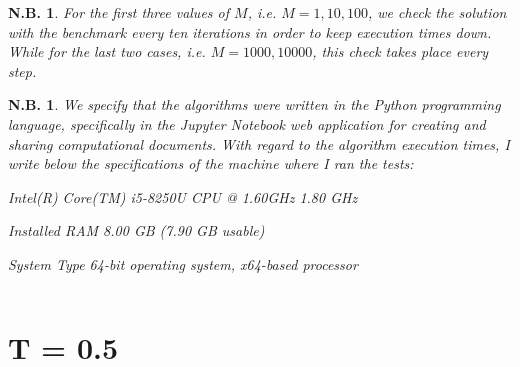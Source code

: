 \documentclass[a4paper,11pt,openright]{report}
\newtheorem{notabene}[teo]{N.B.}
\begin{document}
\begin{notabene}
For the first three values of $M$, i.e. $M = 1, 10, 100$, we check the solution with the benchmark every ten iterations in order to keep execution times down. While for the last two cases, i.e. $M = 1000, 10000$, this check takes place every step.
\end{notabene}

\begin{notabene}
We specify that the algorithms were written in the Python programming language, specifically in the Jupyter Notebook web application for creating and sharing computational documents. With regard to the algorithm execution times, I write below the specifications of the machine where I ran the tests:

Intel(R) Core(TM) i5-8250U CPU @ 1.60GHz 1.80 GHz 

Installed RAM 8.00 GB (7.90 GB usable) 


System Type 64-bit operating system, x64-based processor
\end{notabene}
\[
\]
\newpage
\section{T = 0.5}
\end{document}
